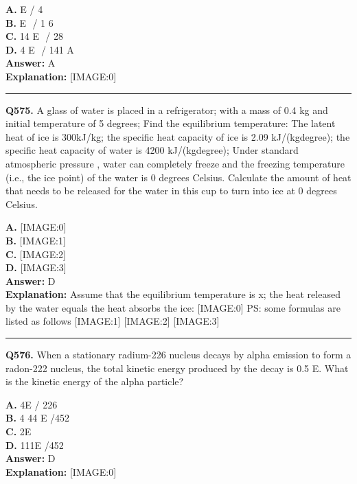 \documentclass[12pt]{article}
\begin{document}
\textbf{A.} E
/
4 \\
\textbf{B.} E
​
/
1
6 \\
\textbf{C.} 14
E
​
/
28 \\
\textbf{D.} 4
E
​
/
141
A \\

\textbf{Answer:} A \\
\textbf{Explanation:} [IMAGE:0]

\hrule
\vspace{1em}


\noindent
\textbf{Q575.} A glass of water is placed in a refrigerator; with a mass of 0.4 kg and initial temperature of 5 degrees; Find the equilibrium temperature: The latent heat of ice is 300kJ/kg; the specific heat capacity of ice is 2.09 kJ/(kg\cdot degree); the specific heat capacity of water is 4200 kJ/(kg\cdot degree); Under standard atmospheric pressure , water can completely freeze and the freezing temperature (i.e., the ice point) of the water is 0 degrees Celsius.
Calculate the amount of heat that needs to be released for the water in this cup to turn into ice at 0 degrees Celsius.



\textbf{A.} [IMAGE:0] \\
\textbf{B.} [IMAGE:1] \\
\textbf{C.} [IMAGE:2] \\
\textbf{D.} [IMAGE:3] \\

\textbf{Answer:} D \\
\textbf{Explanation:} Assume that the equilibrium temperature is x; the heat released by the water equals the heat absorbs the ice:
[IMAGE:0]
PS: some formulas are listed as follows
[IMAGE:1]
[IMAGE:2]
[IMAGE:3]

\hrule
\vspace{1em}


\noindent
\textbf{Q576.} When a stationary radium-226 nucleus decays by alpha emission to form a radon-222 nucleus, the total kinetic energy produced by the decay is
0.5
E. What is the kinetic energy of the alpha particle?



\textbf{A.} 4E​
/
226 \\
\textbf{B.} 4
44
E​
/452 \\
\textbf{C.} 2E​ \\
\textbf{D.} 111E
/452 \\

\textbf{Answer:} D \\
\textbf{Explanation:} [IMAGE:0]
\end{document}
